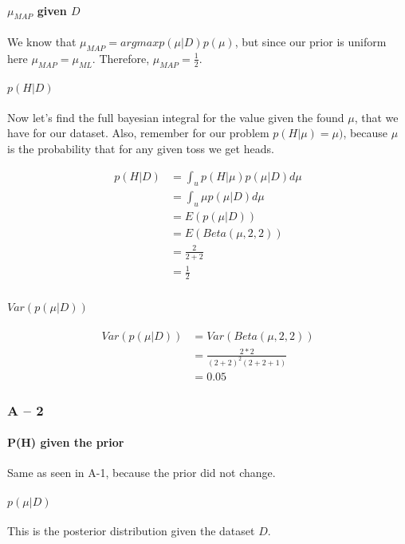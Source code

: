 \documentclass[paper=a4, fontsize=11pt]{scrartcl} %
\begin{document}
\paragraph{$\mu_{MAP}$ given $D$}
We know that $\mu_{MAP} = argmax p(\mu|D)p(\mu)$, but since our prior is uniform here $\mu_{MAP} = \mu_{ML}$.  Therefore, $\mu_{MAP} = \frac{1}{2}$.

\paragraph{$p(H|D)$}
Now let's find the full bayesian integral for the value given the found $\mu$, that we have for our dataset.  Also, remember for our problem $p(H|\mu) = \mu)$, because $\mu$ is the probability that for any given toss we get heads.

\begin{align}
p(H|D) &= \int_u p(H|\mu)p(\mu|D)d\mu \\
&= \int_u \mu p(\mu|D)d\mu \\
&= E( p(\mu|D)) \\
&= E( Beta(\mu,2,2)) \\
&= \frac{2}{2+2} \\
&= \frac{1}{2} \\
\end{align}

\paragraph{$Var(p(\mu|D))$}

\begin{align}
Var(p(\mu|D)) &=  Var(Beta(\mu,2,2)) \\
&= \frac{2*2}{(2+2)^2(2+2+1)} \\
&= 0.05 
\end{align}

\subsubsection{A -- 2}
\paragraph{P(H) given the prior}
Same as seen in A-1, because the prior did not change.

\paragraph{$p(\mu|D)$}
This is the posterior distribution given the dataset $D$. 
\end{document}
